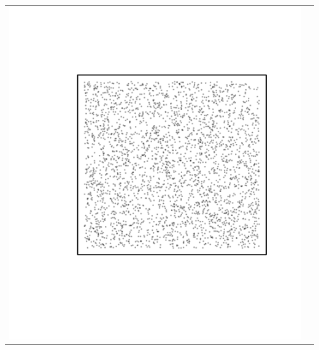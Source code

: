 \documentclass{article}\usepackage{graphicx, color}
\makeatletter
\def\maxwidth{ %
  \ifdim\Gin@nat@width>\linewidth
    \linewidth
  \else
    \Gin@nat@width
  \fi
}
\newenvironment{knitrout}{}{} %
\makeatother
\begin{document}
\vspace*{-1.in}
\begin{tabular}{cc}
\begin{knitrout}
\definecolor{shadecolor}{rgb}{0.969, 0.969, 0.969}\color{fgcolor}\includegraphics[width=\maxwidth]{figure/unnamed-chunk-9} 
\end{knitrout}


\end{tabular}
\end{document}
